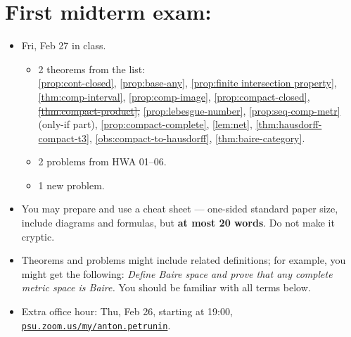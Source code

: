 \section*{First midterm exam: }\label{MT1}
\begin{itemize}
\item Fri, Feb 27 in class.
\begin{itemize}
\item 2 theorems from the list:
\\
\ref{prop:cont-closed}, \ref{prop:base-any},
\ref{prop:finite intersection property}, \ref{thm:comp-interval}, \ref{prop:comp-image}, \ref{prop:compact-closed}, \sout{\ref{thm:compact-product},} \ref{prop:lebesgue-number}, \ref{prop:seq-comp-metr}(only-if part),  \ref{prop:compact-complete}, \ref{lem:net}, \ref{thm:hausdorff-compact-t3}, \ref{obs:compact-to-hausdorff}, \ref{thm:baire-category}.
\item 2 problems from HWA 01--06.
\item 1 new problem.
\end{itemize}
\item You may prepare and use a cheat sheet --- one-sided standard paper size, include diagrams and formulas, but \textbf{at most 20 words}. Do not make it cryptic.
\item Theorems and problems might include related definitions; for example, you might get the following: \textit{Define Baire space and prove that any complete metric space is Baire.}
You should be familiar with all terms below.
\item Extra office hour: Thu, Feb 26, starting at 19:00,\\
\href{https://psu.zoom.us/my/anton.petrunin}{\texttt{psu.zoom.us/my/anton.petrunin}}.
\end{itemize}


